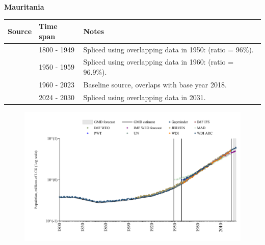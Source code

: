 \documentclass[12pt,a4paper,landscape]{article}
\begin{document}
\begin{adjustbox}{max totalsize={\paperwidth}{\paperheight},center}
\begin{minipage}[t][\textheight][t]{\textwidth}
\vspace*{0.5cm}
{}
\begin{center}
{\Large\bfseries Mauritania}
\end{center}
\vspace{0.5cm}
\begin{table}[H]
\centering
\small
\begin{tabular}{|l|l|l|}
\hline
\textbf{Source} & \textbf{Time span} & \textbf{Notes} \\
\hline
\rowcolor{white}\cite{Gapminder}& 1800 - 1949 &Spliced using overlapping data in 1950: (ratio = 96\%).\\
\rowcolor{lightgray}\cite{IMF_IFS}& 1950 - 1959 &Spliced using overlapping data in 1960: (ratio = 96.9\%).\\
\rowcolor{white}\cite{WDI}& 1960 - 2023 &Baseline source, overlaps with base year 2018.\\
\rowcolor{lightgray}\cite{Gapminder}& 2024 - 2030 &Spliced using overlapping data in 2031.\\
\hline
\end{tabular}
\end{table}
\begin{figure}[H]
\centering
\includegraphics[width=\textwidth,height=0.6\textheight,keepaspectratio]{graphs/MRT_pop.pdf}
\end{figure}
\end{minipage}
\end{adjustbox}
\end{document}
